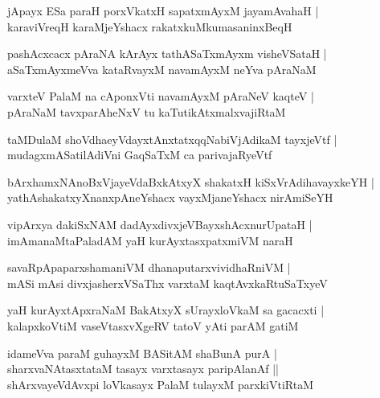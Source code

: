 \documentclass[twoside,12pt,openright]{book}
\newcounter{shloka}[chapter]
\begin{document}
\begin{shloka}%
jApayx ESa paraH porxVkatxH sapatxmAyxM jayamAvahaH |\\
karaviVreqH karaMjeYshacx rakatxkuMkumasaninxBeqH 
\end{shloka}

\begin{shloka}%
pashAcxcacx pAraNA kArAyx tathASaTxmAyxm visheVSataH |\\
aSaTxmAyxmeVva kataRvayxM navamAyxM neYva pAraNaM 
\end{shloka}

\begin{shloka}%
varxteV PalaM na cAponxVti navamAyxM pAraNeV kaqteV |\\
pAraNaM tavxparAheNxV tu kaTutikAtxmalxvajiRtaM 
\end{shloka}

\begin{shloka}%
taMDulaM shoVdhaeyVdayxtAnxtatxqqNabiVjAdikaM tayxjeVtf |\\
mudagxmASatilAdiVni GaqSaTxM ca parivajaRyeVtf 
\end{shloka}

\begin{shloka}%
bArxhamxNAnoBxVjayeVdaBxkAtxyX shakatxH kiSxVrAdihavayxkeYH |\\
yathAshakatxyXnanxpAneYshacx vayxMjaneYshacx nirAmiSeYH
\end{shloka}

\begin{shloka}%
vipArxya dakiSxNAM dadAyxdivxjeVBayxshAcxnurUpataH |\\
imAmanaMtaPaladAM yaH kurAyxtasxpatxmiVM naraH
\end{shloka}

\begin{shloka}%
savaRpApaparxshamaniVM dhanaputarxvividhaRniVM |\\
mASi mAsi divxjasherxVSaThx varxtaM kaqtAvxkaRtuSaTxyeV 
\end{shloka}

\begin{shloka}%
yaH kurAyxtApxraNaM BakAtxyX sUrayxloVkaM sa gacacxti |\\
kalapxkoVtiM vaseVtasxvXgeRV tatoV yAti parAM gatiM
\end{shloka}

\begin{shloka}%
idameVva paraM guhayxM BASitAM shaBunA purA |\\
sharxvaNAtasxtataM tasayx varxtasayx paripAlanAf ||\\
shArxvayeVdAvxpi loVkasayx PalaM tulayxM parxkiVtiRtaM 
\end{shloka}
\end{document}
